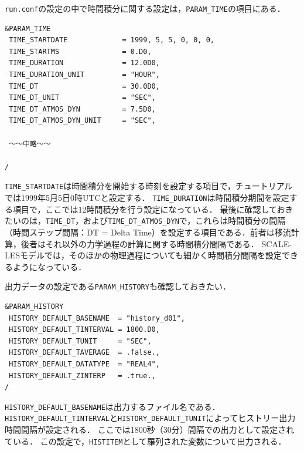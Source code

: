 \verb|run.conf|の設定の中で時間積分に関する設定は，\verb|PARAM_TIME|の項目にある．

\begin{verbatim}
&PARAM_TIME
 TIME_STARTDATE             = 1999, 5, 5, 0, 0, 0,
 TIME_STARTMS               = 0.D0,
 TIME_DURATION              = 12.0D0,
 TIME_DURATION_UNIT         = "HOUR",
 TIME_DT                    = 30.0D0,
 TIME_DT_UNIT               = "SEC",
 TIME_DT_ATMOS_DYN          = 7.5D0,
 TIME_DT_ATMOS_DYN_UNIT     = "SEC",

 ～～中略～～

/
\end{verbatim}

\verb|TIME_STARTDATE|は時間積分を開始する時刻を設定する項目で，チュートリアルでは1999年5月5日0時UTCと設定する．
\verb|TIME_DURATION|は時間積分期間を設定する項目で，ここでは12時間積分を行う設定になっている．
最後に確認しておきたいのは，\verb|TIME_DT|，および\verb|TIME_DT_ATMOS_DYN|で，これらは時間積分の間隔（時間ステップ間隔：DT = Delta Time）を設定する項目である．前者は移流計算，後者はそれ以外の力学過程の計算に関する時間積分間隔である．
SCALE-LESモデルでは，そのほかの物理過程についても細かく時間積分間隔を設定できるようになっている．


出力データの設定である\verb|PARAM_HISTORY|も確認しておきたい．

\begin{verbatim}
&PARAM_HISTORY
 HISTORY_DEFAULT_BASENAME  = "history_d01",
 HISTORY_DEFAULT_TINTERVAL = 1800.D0,
 HISTORY_DEFAULT_TUNIT     = "SEC",
 HISTORY_DEFAULT_TAVERAGE  = .false.,
 HISTORY_DEFAULT_DATATYPE  = "REAL4",
 HISTORY_DEFAULT_ZINTERP   = .true.,
/
\end{verbatim}

\verb|HISTORY_DEFAULT_BASENAME|は出力するファイル名である．
\verb|HISTORY_DEFAULT_TINTERVAL|と\verb|HISTORY_DEFAULT_TUNIT|によってヒストリー出力時間間隔が設定される．
ここでは1800秒（30分）間隔での出力として設定されている．
この設定で，\verb|HISTITEM|として羅列された変数について出力される．

